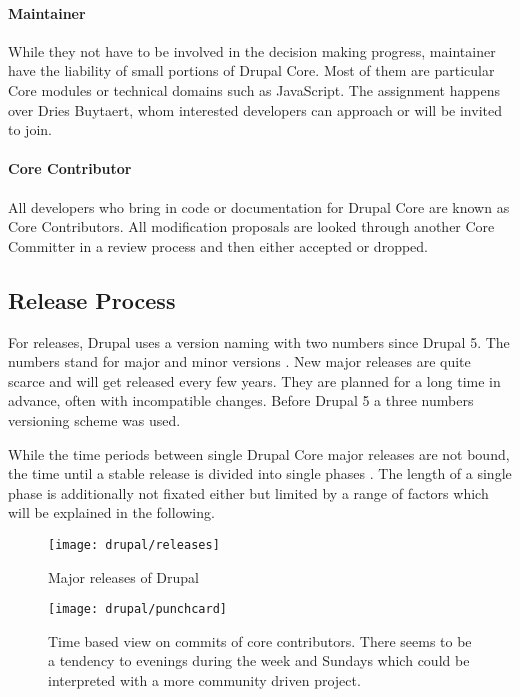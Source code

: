 \paragraph{Maintainer}

While they not have to be involved in the decision making progress, maintainer
have the liability of small portions of Drupal Core. Most of them are
particular Core modules or technical domains such as JavaScript. The assignment
happens over Dries Buytaert, whom interested developers can approach or will be
invited to join.

\paragraph{Core Contributor}

All developers who bring in code or documentation for Drupal Core are known as
Core Contributors. All modification proposals are looked through another Core
Committer in a review process and then either accepted or dropped.


\subsection{Release Process} %

For releases, Drupal uses a version naming with two numbers since Drupal 5. The
numbers stand for major and minor versions \cite{DrupalUpgrade}. New major
releases are quite scarce and will get released every few years. They are
planned for a long time in advance, often with incompatible changes. Before
Drupal 5 a three numbers versioning scheme was used.

While the time periods between single Drupal Core major releases are not bound,
the time until a stable release is divided into single phases
\cite{DrupalReleaseCycle}. The length of a single phase is additionally not
fixated either but limited by a range of factors which will be explained in the
following.

\begin{figure}[htbp]
  \centering
  \texttt{[image: drupal/releases]}
  \caption{Major releases of Drupal}
\end{figure}

\begin{figure}[htbp]
  \centering
  \texttt{[image: drupal/punchcard]}
  \caption{Time based view on commits of core contributors. There seems to be a
  tendency to evenings during the week and Sundays which could be interpreted
  with a more community driven project.}
\end{figure}


